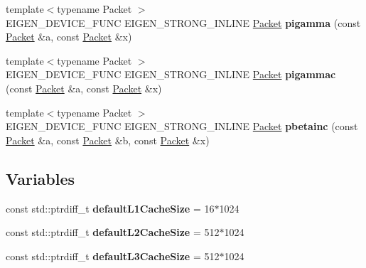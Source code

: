 \begin{DoxyCompactItemize}
{\footnotesize template$<$typename Packet $>$ }\\E\+I\+G\+E\+N\+\_\+\+D\+E\+V\+I\+C\+E\+\_\+\+F\+U\+NC E\+I\+G\+E\+N\+\_\+\+S\+T\+R\+O\+N\+G\+\_\+\+I\+N\+L\+I\+NE \hyperlink{union_eigen_1_1internal_1_1_packet}{Packet} {\bfseries pigamma} (const \hyperlink{union_eigen_1_1internal_1_1_packet}{Packet} \&a, const \hyperlink{union_eigen_1_1internal_1_1_packet}{Packet} \&x)
\item 
\mbox{\label{namespace_eigen_1_1internal_a08c7f56f13ff0685fe63532a997b171b}} 
{\footnotesize template$<$typename Packet $>$ }\\E\+I\+G\+E\+N\+\_\+\+D\+E\+V\+I\+C\+E\+\_\+\+F\+U\+NC E\+I\+G\+E\+N\+\_\+\+S\+T\+R\+O\+N\+G\+\_\+\+I\+N\+L\+I\+NE \hyperlink{union_eigen_1_1internal_1_1_packet}{Packet} {\bfseries pigammac} (const \hyperlink{union_eigen_1_1internal_1_1_packet}{Packet} \&a, const \hyperlink{union_eigen_1_1internal_1_1_packet}{Packet} \&x)
\item 
\mbox{\label{namespace_eigen_1_1internal_a6535e6780ff1e54e2c9326f17d7b52c3}} 
{\footnotesize template$<$typename Packet $>$ }\\E\+I\+G\+E\+N\+\_\+\+D\+E\+V\+I\+C\+E\+\_\+\+F\+U\+NC E\+I\+G\+E\+N\+\_\+\+S\+T\+R\+O\+N\+G\+\_\+\+I\+N\+L\+I\+NE \hyperlink{union_eigen_1_1internal_1_1_packet}{Packet} {\bfseries pbetainc} (const \hyperlink{union_eigen_1_1internal_1_1_packet}{Packet} \&a, const \hyperlink{union_eigen_1_1internal_1_1_packet}{Packet} \&b, const \hyperlink{union_eigen_1_1internal_1_1_packet}{Packet} \&x)
\end{DoxyCompactItemize}
\subsection*{Variables}
\begin{DoxyCompactItemize}
\item 
\mbox{\label{namespace_eigen_1_1internal_aca0e350087dd459cc7e036355dca1fb7}} 
const std\+::ptrdiff\+\_\+t {\bfseries default\+L1\+Cache\+Size} = 16$\ast$1024
\item 
\mbox{\label{namespace_eigen_1_1internal_a04dbd7a9ba7069a05726b5b09d1ee5db}} 
const std\+::ptrdiff\+\_\+t {\bfseries default\+L2\+Cache\+Size} = 512$\ast$1024
\item 
\mbox{\label{namespace_eigen_1_1internal_a79ced96f603f3cf40ee565c8fb9002fb}} 
const std\+::ptrdiff\+\_\+t {\bfseries default\+L3\+Cache\+Size} = 512$\ast$1024
\end{DoxyCompactItemize}


